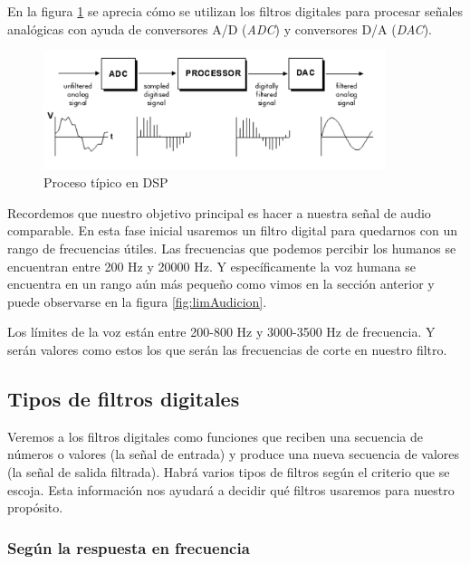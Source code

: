 En la figura \ref{fig:DSPanalog} se aprecia cómo se utilizan los filtros digitales para procesar señales analógicas con ayuda de conversores A/D (\emph{ADC}) y conversores D/A (\emph{DAC}).

\begin{figure}[th]
\centering
\includegraphics[width=10cm]{Figures/DSP-analog}
\decoRule
\caption[DSPanalog]{Proceso típico en DSP}
\label{fig:DSPanalog}
\end{figure}

Recordemos que nuestro objetivo principal es hacer a nuestra señal de audio comparable. En esta fase inicial usaremos un filtro digital para quedarnos con un rango de frecuencias útiles. Las frecuencias que podemos percibir los humanos se encuentran entre 200 Hz y 20000 Hz. Y específicamente la voz humana se encuentra en un rango aún más pequeño como vimos en la sección anterior y puede observarse en la figura \ref{fig:limAudicion}.  

Los límites de la voz están entre 200-800 Hz y 3000-3500 Hz de frecuencia. Y serán valores como estos los que serán las frecuencias de corte en nuestro filtro.

\subsection{Tipos de filtros digitales}

Veremos a los filtros digitales como funciones que reciben una secuencia de números o valores (la señal de entrada) y produce una nueva secuencia de valores (la señal de salida filtrada).
Habrá varios tipos de filtros según el criterio que se escoja. Esta información nos ayudará a decidir qué filtros usaremos para nuestro propósito.

\subsubsection{Según la respuesta en frecuencia}

